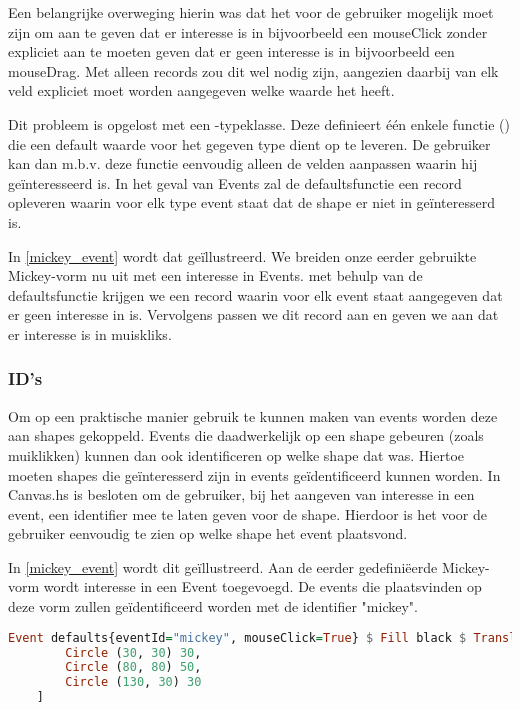 Een belangrijke overweging hierin was dat het voor de gebruiker mogelijk moet zijn om aan te geven dat er interesse is in bijvoorbeeld een mouseClick zonder expliciet aan te moeten geven dat er geen interesse is in bijvoorbeeld een mouseDrag. Met alleen records zou dit wel nodig zijn, aangezien daarbij van elk veld expliciet moet worden aangegeven welke waarde het heeft.

Dit probleem is opgelost met een -typeklasse. Deze definieert één enkele functie () die een default waarde voor het gegeven type dient op te leveren. De gebruiker kan dan m.b.v. deze functie eenvoudig alleen de velden aanpassen waarin hij geïnteresseerd is. In het geval van Events zal de defaultsfunctie een record opleveren waarin voor elk type event staat dat de shape er niet in ge\"interesserd is. 

In \autoref{mickey_event} wordt dat geïllustreerd. We breiden onze eerder gebruikte Mickey-vorm nu uit met een interesse in Events. met behulp van de defaultsfunctie krijgen we een record waarin voor elk event staat aangegeven dat er geen interesse in is. Vervolgens passen we dit record aan en geven we aan dat er interesse is in muiskliks.

\subsubsection{ID's}
Om op een praktische manier gebruik te kunnen maken van events worden deze aan shapes gekoppeld. Events die daadwerkelijk op een shape gebeuren (zoals muiklikken) kunnen dan ook identificeren op welke shape dat was. Hiertoe moeten shapes die ge\"interesserd zijn in events geïdentificeerd kunnen worden. In Canvas.hs is besloten om de gebruiker, bij het aangeven van interesse in een event, een identifier mee te laten geven voor de shape. Hierdoor is het voor de gebruiker eenvoudig te zien op welke shape het event plaatsvond.

In \autoref{mickey_event} wordt dit geïllustreerd. Aan de eerder gedefiniëerde Mickey-vorm wordt interesse in een Event toegevoegd. De events die plaatsvinden op deze vorm zullen geïdentificeerd worden met de identifier "mickey".

\begin{lstlisting}[style=densecode, language=Haskell, caption=Mickey-figuur met interesse in een Event, label=mickey_event]
Event defaults{eventId="mickey", mouseClick=True} $ Fill black $ Translate 100 100 $ Rotate 90 $ Offset (80, 65) $ Container 160 130 [
        Circle (30, 30) 30,
        Circle (80, 80) 50,
        Circle (130, 30) 30
    ]
\end{lstlisting}


